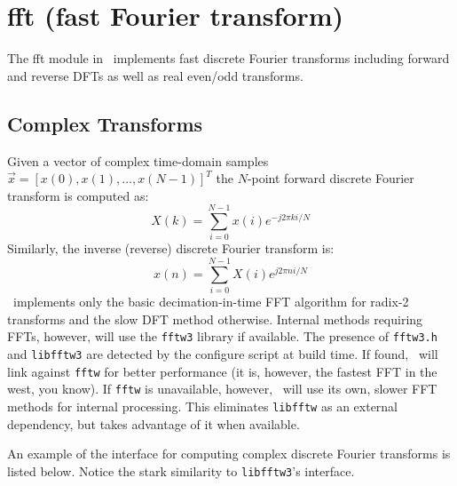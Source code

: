 % 
%

\newpage
\section{fft (fast Fourier transform)}
\label{module:fft}
%
The fft module in \liquid\ implements fast discrete Fourier transforms
including forward and reverse DFTs as well as real even/odd transforms.

\subsection{Complex Transforms}
\label{module:fft:dft}
Given a vector of complex time-domain samples
$\vec{x} = \left[x(0),x(1),\ldots,x(N-1)\right]^T$
the $N$-point forward discrete Fourier transform is computed as:
%
\begin{equation}
\label{eqn:fft:dft}
    X(k) = \sum_{i=0}^{N-1}{x(i) e^{-j 2 \pi k i/N}}
\end{equation}
%
Similarly, the inverse (reverse) discrete Fourier transform is:
\begin{equation}
\label{eqn:fft:idft}
    x(n) = \sum_{i=0}^{N-1}{X(i) e^{ j 2 \pi n i/N}}
\end{equation}
%
\liquid\ implements only the basic decimation-in-time FFT algorithm for
radix-2 transforms and the slow DFT method otherwise.
Internal methods requiring FFTs, however, will use the {\tt fftw3}
library \cite{fftw:web} if available.
The presence of {\tt fftw3.h} and {\tt libfftw3} are detected by the
configure script at build time.
If found, \liquid\ will link against {\tt fftw} for better performance
(it is, however, the fastest FFT in the west, you know).
If {\tt fftw} is unavailable, however, \liquid\ will use its own, slower
FFT methods for internal processing.
This eliminates {\tt libfftw} as an external dependency, but takes
advantage of it when available.

An example of the interface for computing complex discrete Fourier
transforms is listed below.
Notice the stark similarity to {\tt libfftw3}'s interface.
%

%

